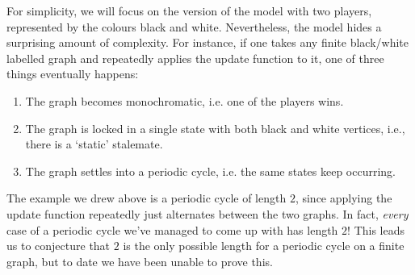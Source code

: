 \documentclass{article}
\theoremstyle{plain}
\theoremstyle{definition}
\begin{document}
\begin{center}
\end{center}

For simplicity, we will focus on the version of the model with two players, represented by the colours black and white. Nevertheless, the model hides a surprising amount of complexity. For instance, if one takes any finite black/white labelled graph and repeatedly applies the update function to it, one of three things eventually happens:

\begin{enumerate}
  \item The graph becomes monochromatic, i.e. one of the players wins.
  \item The graph is locked in a single state with both black and white vertices, i.e., there is a `static' stalemate.
  \item The graph settles into a periodic cycle, i.e. the same states keep occurring.
\end{enumerate}

The example we drew above is a periodic cycle of length $2$, since applying the update function repeatedly just alternates between the two graphs. In fact, \emph{every} case of a periodic cycle we've managed to come up with has length $2$! This leads us to conjecture that $2$ is the only possible length for a periodic cycle on a finite graph, but to date we have been unable to prove this.
\end{document}
